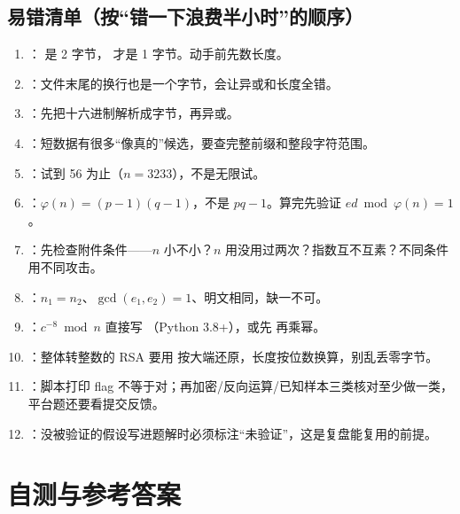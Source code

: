 \documentclass[UTF8,12pt,oneside]{ctexbook}
\begin{document}
\section{易错清单（按“错一下浪费半小时”的顺序）}
\begin{enumerate}
\item {}： 是 2 字节， 才是 1 字节。动手前先数长度。
\item {}：文件末尾的换行也是一个字节，会让异或和长度全错。
\item {}：先把十六进制解析成字节，再异或。
\item {}：短数据有很多“像真的”候选，要查完整前缀和整段字符范围。
\item {}：试到 56 为止（$n = 3233$），不是无限试。
\item {}：$\varphi(n) = (p-1)(q-1)$，不是 $pq - 1$。算完先验证 $ed \bmod \varphi(n) = 1$。
\item {}：先检查附件条件——$n$ 小不小？$n$ 用没用过两次？指数互不互素？不同条件用不同攻击。
\item {}：$n_1 = n_2$、$\gcd(e_1, e_2) = 1$、明文相同，缺一不可。
\item {}：$c^{-8} \bmod n$ 直接写 （Python 3.8+），或先  再乘幂。
\item {}：整体转整数的 RSA 要用  按大端还原，长度按位数换算，别乱丢零字节。
\item {}：脚本打印 flag 不等于对；再加密/反向运算/已知样本三类核对至少做一类，平台题还要看提交反馈。
\item {}：没被验证的假设写进题解时必须标注“未验证”，这是复盘能复用的前提。
\end{enumerate}


\chapter{自测与参考答案}
\end{document}
